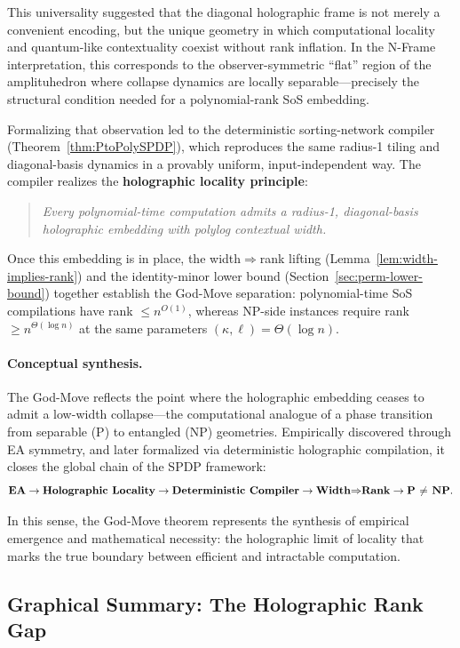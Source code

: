 \documentclass[12pt]{article}
\theoremstyle{definition}
\theoremstyle{definition}
\theoremstyle{remark}
\theoremstyle{remark}
\begin{document}
This universality suggested that the diagonal holographic frame is not merely a convenient encoding, but the unique geometry in which computational locality and quantum-like contextuality coexist without rank inflation. In the N-Frame interpretation, this corresponds to the observer-symmetric ``flat'' region of the amplituhedron where collapse dynamics are locally separable---precisely the structural condition needed for a polynomial-rank SoS embedding.

Formalizing that observation led to the deterministic sorting-network compiler (Theorem~\ref{thm:PtoPolySPDP}), which reproduces the same radius-1 tiling and diagonal-basis dynamics in a provably uniform, input-independent way. The compiler realizes the \textbf{holographic locality principle}:
\begin{quote}
\textit{Every polynomial-time computation admits a radius-1, diagonal-basis holographic embedding with polylog contextual width.}
\end{quote}

Once this embedding is in place, the width$\Rightarrow$rank lifting (Lemma~\ref{lem:width-implies-rank}) and the identity-minor lower bound (Section~\ref{sec:perm-lower-bound}) together establish the God-Move separation: polynomial-time SoS compilations have rank $\leq n^{O(1)}$, whereas NP-side instances require rank $\geq n^{\Theta(\log n)}$ at the same parameters $(\kappa, \ell) = \Theta(\log n)$.

\paragraph{Conceptual synthesis.}
The God-Move reflects the point where the holographic embedding ceases to admit a low-width collapse---the computational analogue of a phase transition from separable (P) to entangled (NP) geometries. Empirically discovered through EA symmetry, and later formalized via deterministic holographic compilation, it closes the global chain of the SPDP framework:
\[
\text{\textbf{EA}} \rightarrow \text{\textbf{Holographic Locality}} \rightarrow \text{\textbf{Deterministic Compiler}} \rightarrow \text{\textbf{Width$\Rightarrow$Rank}} \rightarrow \text{\textbf{P $\neq$ NP}}.
\]

In this sense, the God-Move theorem represents the synthesis of empirical emergence and mathematical necessity: the holographic limit of locality that marks the true boundary between efficient and intractable computation.

\subsection{Graphical Summary: The Holographic Rank Gap}
\end{document}
